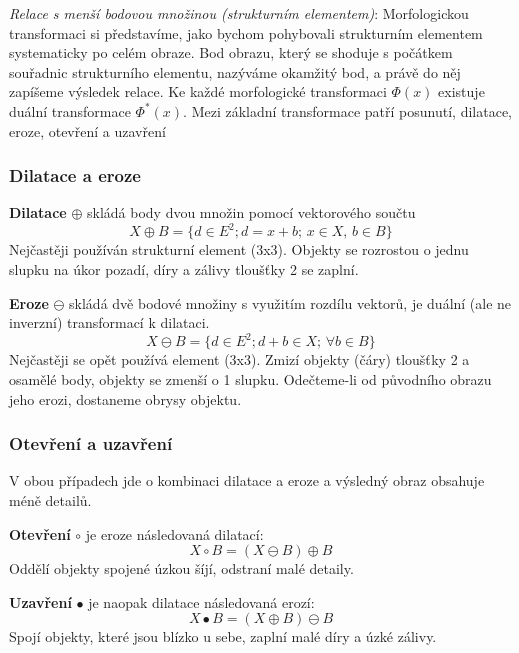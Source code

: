 \textit{Relace s menší bodovou množinou (strukturním elementem)}: Morfologickou transformaci si představíme, jako bychom pohybovali strukturním elementem systematicky po celém obraze. Bod obrazu, který se shoduje s počátkem souřadnic strukturního elementu, nazýváme okamžitý bod, a právě do něj zapíšeme výsledek relace. Ke každé morfologické transformaci $ \Phi(x) $ existuje duální transformace $ \Phi^*(x) $. Mezi základní transformace patří posunutí, dilatace, eroze, otevření a uzavření

\subsubsection*{Dilatace a eroze}
\textbf{Dilatace} $ \oplus $ skládá body dvou množin pomocí vektorového součtu
\begin{equation}
X \oplus B = \{ d \in E^2; d = x+b; \, x \in X, \, b \in B \}
\end{equation}
Nejčastěji používán strukturní element (3x3). Objekty se rozrostou o jednu slupku na úkor pozadí, díry a zálivy tloušťky 2 se zaplní.

\textbf{Eroze} $ \ominus $ skládá dvě bodové množiny s využitím rozdílu vektorů, je duální (ale ne inverzní) transformací k dilataci.
\begin{equation}
X \ominus B = \{ d \in E^2; d + b \in X; \, \forall b \in B \}
\end{equation}
Nejčastěji se opět používá element (3x3). Zmizí objekty (čáry) tloušťky 2 a osamělé body, objekty se zmenší o 1 slupku. Odečteme-li od původního obrazu jeho erozi, dostaneme obrysy objektu.

\subsubsection*{Otevření a uzavření}
V obou případech jde o kombinaci dilatace a eroze a výsledný obraz obsahuje méně detailů.

\textbf{Otevření} $ \circ $ je eroze následovaná dilatací:
\begin{equation}
X \circ B = (X \ominus B) \oplus B
\end{equation}
Oddělí objekty spojené úzkou šíjí, odstraní malé detaily.

\textbf{Uzavření} $ \bullet $ je naopak dilatace následovaná erozí:
\begin{equation}
X \bullet B = (X \oplus B) \ominus B
\end{equation}
Spojí objekty, které jsou blízko u sebe, zaplní malé díry a úzké zálivy.


